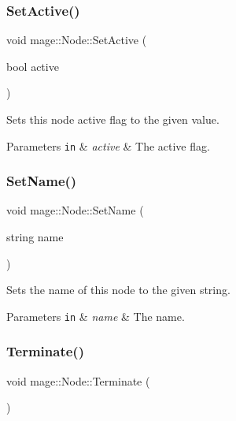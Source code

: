 \subsubsection{\texorpdfstring{Set\+Active()}{SetActive()}}
{\footnotesize\ttfamily void mage\+::\+Node\+::\+Set\+Active (\begin{DoxyParamCaption}\item[{bool}]{active }\end{DoxyParamCaption})\hspace{0.3cm}{\ttfamily [noexcept]}}

Sets this node active flag to the given value.


\begin{DoxyParams}[1]{Parameters}
\mbox{\tt in}  & {\em active} & The active flag. \\
\hline
\end{DoxyParams}
\hypertarget{classmage_1_1_node_a78e4ef8457d200662d2f4881cef08688}{}\label{classmage_1_1_node_a78e4ef8457d200662d2f4881cef08688} 
\subsubsection{\texorpdfstring{Set\+Name()}{SetName()}}
{\footnotesize\ttfamily void mage\+::\+Node\+::\+Set\+Name (\begin{DoxyParamCaption}\item[{string}]{name }\end{DoxyParamCaption})\hspace{0.3cm}{\ttfamily [noexcept]}}

Sets the name of this node to the given string.


\begin{DoxyParams}[1]{Parameters}
\mbox{\tt in}  & {\em name} & The name. \\
\hline
\end{DoxyParams}
\hypertarget{classmage_1_1_node_aa3dfb60e905aadef7537b1fb5bdc79e6}{}\label{classmage_1_1_node_aa3dfb60e905aadef7537b1fb5bdc79e6} 
\subsubsection{\texorpdfstring{Terminate()}{Terminate()}}
{\footnotesize\ttfamily void mage\+::\+Node\+::\+Terminate (\begin{DoxyParamCaption}{ }\end{DoxyParamCaption})\hspace{0.3cm}{\ttfamily [noexcept]}}

